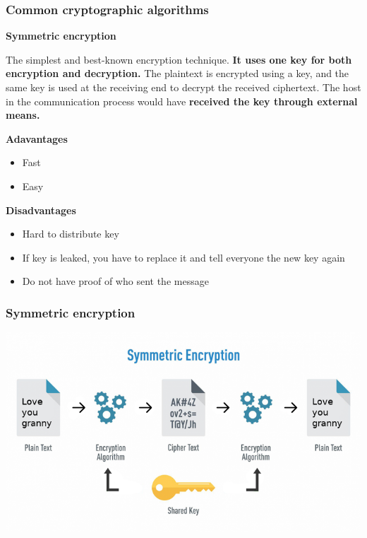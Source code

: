 \documentclass{beamer}
\begin{document}
\begin{frame}
	\frametitle{Common cryptographic algorithms}
	
	{\footnotesize \textbf{\textcolor{revassecondary}{Symmetric encryption}}}
	
	The simplest and best-known encryption technique. \textbf{It uses one key for both encryption and decryption.} \newline
	{\small The plaintext is encrypted using a key, and the same key is used at the receiving end to decrypt the received ciphertext. The host in the communication process would have \textbf{received the key through external means.}} 
	
	 {\footnotesize \textbf{\textcolor{revassecondary}{Adavantages}}}
	\begin{itemize}	
		\item Fast
		\item Easy
	\end{itemize}	
	
	 {\footnotesize \textbf{\textcolor{revassecondary}{Disadvantages}}}
	\begin{itemize}	
		\item Hard to distribute key
		\item If key is leaked, you have to replace it and tell everyone the new key again
		\item Do not have proof of who sent the message
	\end{itemize}	
\end{frame}

\begin{frame}
	\frametitle{Symmetric encryption}

	\includegraphics[width=\textwidth]{./resources/symmetric_encryption.png}
	
\end{frame}
\end{document}
